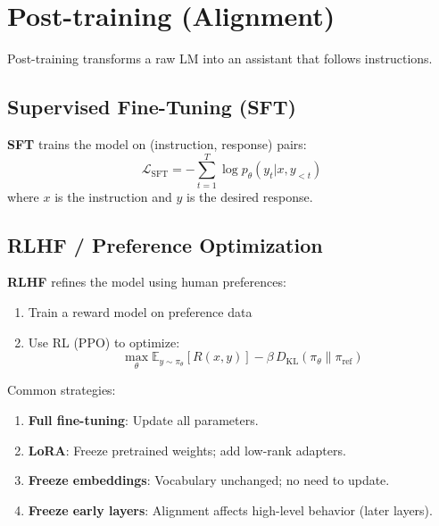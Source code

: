 \section{Post-training (Alignment)}

Post-training transforms a raw LM into an assistant that follows instructions.

\subsection{Supervised Fine-Tuning (SFT)}

\begin{definition}
    \textbf{SFT} trains the model on (instruction, response) pairs:
    \[
        \mathcal{L}_{\text{SFT}} = -\sum_{t=1}^{T} \log p_\theta(y_t | x, y_{<t})
    \]
    where $x$ is the instruction and $y$ is the desired response.
\end{definition}

\subsection{RLHF / Preference Optimization}

\begin{definition}[RLHF]
    \textbf{RLHF} refines the model using human preferences:
    \begin{enumerate}
        \item Train a reward model on preference data
        \item Use RL (PPO) to optimize:
              \[
                  \max_\theta \mathbb{E}_{y \sim \pi_\theta}[R(x, y)] - \beta \, D_{\mathrm{KL}}(\pi_\theta \| \pi_{\text{ref}})
              \]
    \end{enumerate}
\end{definition}

\begin{remark}
    Common strategies:
    \begin{enumerate}
        \item \textbf{Full fine-tuning}: Update all parameters.
        \item \textbf{LoRA}: Freeze pretrained weights; add low-rank adapters.
        \item \textbf{Freeze embeddings}: Vocabulary unchanged; no need to update.
        \item \textbf{Freeze early layers}: Alignment affects high-level behavior (later layers).
    \end{enumerate}
\end{remark}

